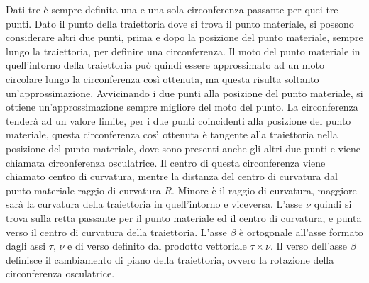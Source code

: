 \documentclass{article}
\numberwithin{equation}{subsection}
\begin{document}
Dati tre è sempre definita una e una sola circonferenza passante per quei tre punti. Dato il punto della traiettoria dove si trova il punto materiale, si possono considerare 
altri due punti, prima e dopo la posizione del punto materiale, sempre lungo la traiettoria, per definire una circonferenza. Il moto del punto materiale in quell'intorno della 
traiettoria può quindi essere approssimato ad un moto circolare lungo la circonferenza così ottenuta, ma questa risulta soltanto un'approssimazione. Avvicinando i due punti 
alla posizione del punto materiale, si ottiene un'approssimazione sempre migliore del moto del punto. La circonferenza tenderà ad un valore limite, per i due punti coincidenti 
alla posizione del punto materiale, questa circonferenza così ottenuta è tangente alla traiettoria nella posizione del punto materiale, dove sono presenti anche gli altri due 
punti e viene chiamata circonferenza osculatrice. Il centro di questa circonferenza viene chiamato centro di curvatura, mentre la distanza del centro di curvatura dal punto 
materiale raggio di curvatura $R$. Minore è il raggio di curvatura, maggiore sarà la curvatura della traiettoria in quell'intorno e viceversa. L'asse $\nu$ quindi si trova 
sulla retta passante per il punto materiale ed il centro di curvatura, e punta verso il centro di curvatura della traiettoria. L'asse $\beta$ è ortogonale all'asse formato 
dagli assi $\tau,\,\nu$ e di verso definito dal prodotto vettoriale $\tau\times\nu$. Il verso dell'asse $\beta$ definisce il cambiamento di piano della traiettoria, ovvero 
la rotazione della circonferenza osculatrice. 
\end{document}
